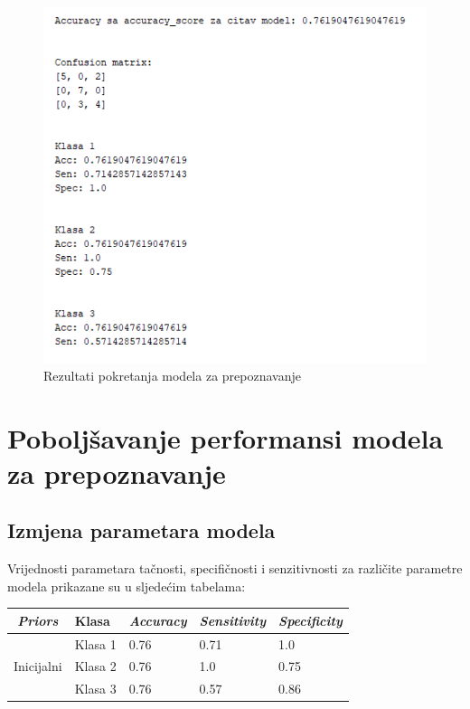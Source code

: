 \documentclass[12pt,a4paper]{article}
\begin{document}
\begin{figure}[H]

\center
\includegraphics[scale=0.9]{slikaTest.png}
\caption{Rezultati pokretanja modela za prepoznavanje}
	
\end{figure}

\newpage

\section{Poboljšavanje performansi modela za prepoznavanje}

\subsection{Izmjena parametara modela}

Vrijednosti parametara tačnosti, specifičnosti i senzitivnosti za različite parametre modela prikazane su u sljedećim tabelama:

\begin{table}[H]
\centering
\begin{tabular}{|c|l|l|l|l|}
\hline
\textbf{\textit{Priors}}							& \textbf{Klasa}   	& \textbf{\textit{Accuracy}} 	& \textbf{\textit{Sensitivity}} 	& \textbf{\textit{Specificity}} 		\\ \hline
\multirow{3}{*}{Inicijalni}    	 				& Klasa 1 			& 0.76              					& 0.71                 					& 1.0                  						\\ \cline{2-5} 
                                							& Klasa 2 			& 0.76              					& 1.0                  					& 0.75                 						\\ \cline{2-5} 
                                							& Klasa 3 			& 0.76              					& 0.57                 					& 0.86                 						\\ \hline
\end{tabular}
\end{table}
\end{document}
